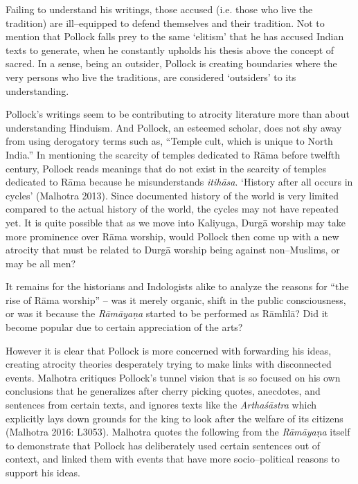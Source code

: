 Failing to understand his writings, those accused (i.e. those who live the tradition) are ill–equipped to defend themselves and their tradition. Not to mention that Pollock falls prey to the same ‘elitism’ that he has accused Indian texts to generate, when he constantly upholds his thesis above the concept of sacred. In a sense, being an outsider, Pollock is creating boundaries where the very persons who live the traditions, are considered ‘outsiders’ to its understanding.

Pollock’s writings seem to be contributing to atrocity literature more than about understanding Hinduism. And Pollock, an esteemed scholar, does not shy away from using derogatory terms such as, “Temple cult, which is unique to North India.” In mentioning the scarcity of temples dedicated to Rāma before twelfth century, Pollock reads meanings that do not exist in the scarcity of temples dedicated to Rāma because he misunderstands \textit{itihāsa}. ‘History after all occurs in cycles’ (Malhotra 2013). Since documented history of the world is very limited compared to the actual history of the world, the cycles may not have repeated yet. It is quite possible that as we move into Kaliyuga, Durgā worship may take more prominence over Rāma worship, would Pollock then come up with a new atrocity that must be related to Durgā worship being against non–Muslims, or may be all men?

It remains for the historians and Indologists alike to analyze the reasons for “the rise of Rāma worship” – was it merely organic, shift in the public consciousness, or was it because the \textit{Rāmāyaṇa} started to be performed as Rāmlīlā? Did it become popular due to certain appreciation of the arts?

However it is clear that Pollock is more concerned with forwarding his ideas, creating atrocity theories desperately trying to make links with disconnected events. Malhotra critiques Pollock’s tunnel vision that is so focused on his own conclusions that he generalizes after cherry picking quotes, anecdotes, and sentences from certain texts, and ignores texts like the \textit{Arthaśāstra} which explicitly lays down grounds for the king to look after the welfare of its citizens (Malhotra 2016: L3053). Malhotra quotes the following from the \textit{Rāmāyaṇa} itself to demonstrate that Pollock has deliberately used certain sentences out of context, and linked them with events that have more socio–political reasons to support his ideas.

